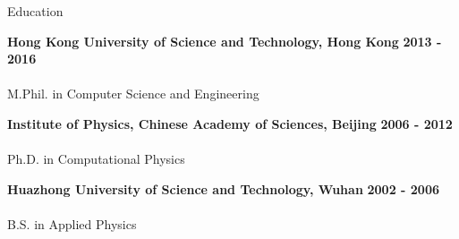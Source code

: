 \documentclass{resume} %
\begin{document}
\begin{rSection}{Education}

{\bf Hong Kong University of Science and Technology, Hong Kong} \hfill {\bf 2013 - 2016} \\
\hspace*{2em}{\it Thesis: Context-aware visual privacy control} \\
\hspace*{2em}M.Phil. in Computer Science and Engineering

{\bf Institute of Physics, Chinese Academy of Sciences, Beijing} \hfill {\bf 2006 - 2012} \\
\hspace*{2em}{\it Thesis: Monte Carlo methods and applications on magnetic models} \\
\hspace*{2em}Ph.D. in Computational Physics

{\bf Huazhong University of Science and Technology, Wuhan} \hfill {\bf 2002 - 2006} \\
\hspace*{2em}{\it Thesis: Colossal magnetoresistance in Perovskite Oxide} \\
\hspace*{2em}B.S. in Applied Physics

\end{rSection}

\end{document}
